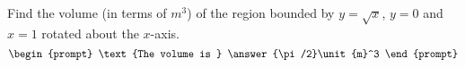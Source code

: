 \documentclass{ximera}
\author{Gregory Hartman \and Matthew Carr}
\begin{document}
\begin{exercise}






Find the volume (in terms of $\unit{m}^3$) of the region bounded by $y=\sqrt{x}$, $y=0$ and $x=1$ rotated about the $x$-axis.
\[
\begin{prompt}
\text{The volume is } \answer{\pi/2}\unit{m}^3
\end{prompt}
\]




\end{exercise}
\end{document}
